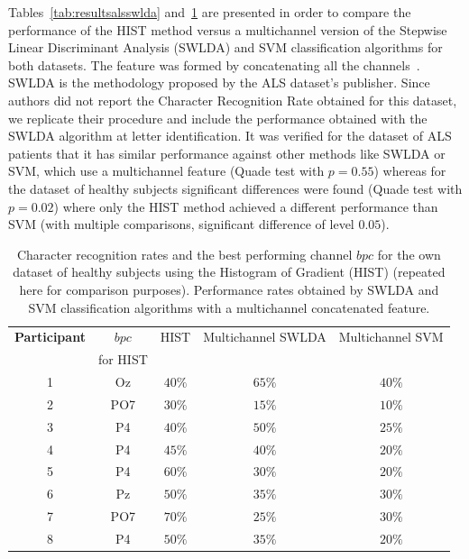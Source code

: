 Tables~\ref{tab:resultsalsswlda} and~\ref{tab:resultsownswlda} are presented in order to compare the performance of the HIST method versus a multichannel version of the Stepwise Linear Discriminant Analysis (SWLDA) and SVM classification algorithms for both datasets.  The feature was formed by concatenating all the channels~\cite{Krusienski2006}.  SWLDA is the methodology proposed by the ALS dataset's publisher. Since authors \cite{Riccio2013} did not report the Character Recognition Rate obtained for this dataset, we replicate their procedure and include the performance obtained with the SWLDA algorithm at letter identification.  It was verified for the dataset of ALS patients that it has similar performance  against other methods like SWLDA or SVM, which use a multichannel feature (Quade test with $p=0.55$) whereas for the dataset of healthy subjects significant differences were found (Quade test with $p=0.02$) where only the HIST method achieved a different performance than SVM (with multiple comparisons, significant difference of level $0.05$).

\begin{table}[htb]
\caption[Character Recognition Rates for Healthy Subject's Dataset]{Character recognition rates and the best performing channel $bpc$ for the own dataset of healthy subjects using the Histogram of Gradient (HIST) (repeated here for comparison purposes).   Performance rates obtained by SWLDA and SVM classification algorithms with a multichannel concatenated feature.}
\centering
\begin{tabular}{c|cc|c|c}
\toprule
\textbf{Participant}	&  $bpc$ 	&  HIST & Multichannel SWLDA & Multichannel SVM  \\
                                    &  for HIST        &           &                                       &   \\
\midrule
1     &     Oz   &     $40\%$  &     $65\%$  &     $40\%$ \\
2     &     PO7   &     $30\%$ &   $15\%$  &     $10\%$ \\
3     &     P4   &     $40\%$ &     $50\%$  &     $25\%$ \\
4     &     P4   &     $45\%$ &     $40\%$  &     $20\%$ \\
5     &     P4   &      $60\%$ &    $30\%$  &     $20\%$ \\
6     &     Pz   &      $50\%$ &    $35\%$  &     $30\%$ \\
7     &     PO7   &      $70\%$ &  $25\%$  &     $30\%$ \\
8     &     P4   &      $50\%$ &    $35\%$  &     $20\%$ \\

\end{tabular}
\label{tab:resultsownswlda}
\end{table}

